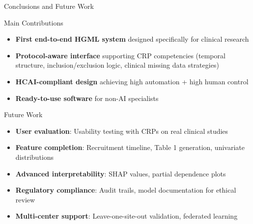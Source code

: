 \documentclass[aspectratio=169,10pt,english,dvipsnames]{beamer}
\begin{document}
\begin{frame}{Conclusions and Future Work}
    \begin{block}{Main Contributions}
        \begin{itemize}
            \item \textbf{First end-to-end HGML system} designed specifically for clinical research
            \item \textbf{Protocol-aware interface} supporting CRP competencies (temporal structure, inclusion/exclusion logic, clinical missing data strategies)
            \item \textbf{HCAI-compliant design} achieving high automation + high human control
            \item \textbf{Ready-to-use software} for non-AI specialists
        \end{itemize}
    \end{block}
    
    \begin{block}{Future Work}
        \begin{itemize}
            \item \textbf{User evaluation}: Usability testing with CRPs on real clinical studies
            \item \textbf{Feature completion}: Recruitment timeline, Table 1 generation, univariate distributions
            \item \textbf{Advanced interpretability}: SHAP values, partial dependence plots
            \item \textbf{Regulatory compliance}: Audit trails, model documentation for ethical review
            \item \textbf{Multi-center support}: Leave-one-site-out validation, federated learning
        \end{itemize}
    \end{block}
\end{frame}


\begin{frame}
    \titlepage
\end{frame}
\end{document}
